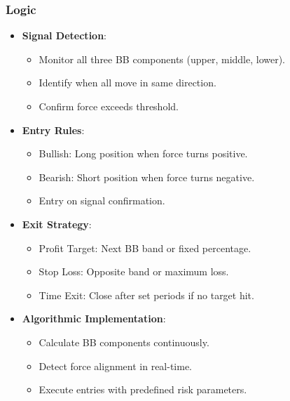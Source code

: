 \documentclass[12pt]{article}
\begin{document}
\subsubsection{Logic}
\begin{itemize}
\item \textbf{Signal Detection}:
  \begin{itemize}
  \item Monitor all three BB components (upper, middle, lower).
  \item Identify when all move in same direction.
  \item Confirm force exceeds threshold.
  \end{itemize}
\item \textbf{Entry Rules}:
  \begin{itemize}
  \item Bullish: Long position when force turns positive.
  \item Bearish: Short position when force turns negative.
  \item Entry on signal confirmation.
  \end{itemize}
\item \textbf{Exit Strategy}:
  \begin{itemize}
  \item Profit Target: Next BB band or fixed percentage.
  \item Stop Loss: Opposite band or maximum loss.
  \item Time Exit: Close after set periods if no target hit.
  \end{itemize}
\item \textbf{Algorithmic Implementation}:
  \begin{itemize}
  \item Calculate BB components continuously.
  \item Detect force alignment in real-time.
  \item Execute entries with predefined risk parameters.
  \end{itemize}
\end{itemize}
\end{document}
